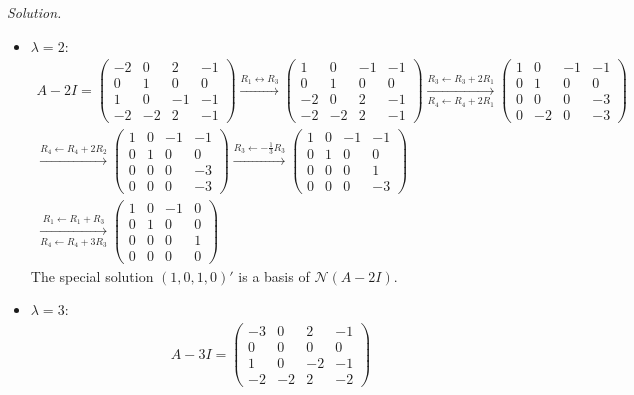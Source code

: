 \documentclass[12pt]{article}
\theoremstyle{definition}
\newenvironment{solution}{\par\noindent\textit{Solution.}\ }{\par\smallskip}
\begin{document}
\begin{solution}
\begin{itemize}
\[\begin{gathered}
\end{gathered}
\]
The special solution \((1,0,1,1)'\) is a basis of \(\mathcal N(A-I)\).
\item \(\lambda=2\):
\[
\begin{gathered}
A-2I=\begin{pmatrix}-2&0&2&-1\\0&1&0&0\\1&0&-1&-1\\-2&-2&2&-1\end{pmatrix}
\xrightarrow{R_1\leftrightarrow R_3}
\begin{pmatrix}1&0&-1&-1\\0&1&0&0\\-2&0&2&-1\\-2&-2&2&-1\end{pmatrix}
\xrightarrow[R_4\leftarrow R_4+2R_1]{R_3\leftarrow R_3+2R_1}
\begin{pmatrix}1&0&-1&-1\\0&1&0&0\\0&0&0&-3\\0&-2&0&-3\end{pmatrix}
\\
\xrightarrow{R_4\leftarrow R_4+2R_2}
\begin{pmatrix}1&0&-1&-1\\0&1&0&0\\0&0&0&-3\\0&0&0&-3\end{pmatrix}
\xrightarrow{R_3\leftarrow-\frac13R_3}
\begin{pmatrix}1&0&-1&-1\\0&1&0&0\\0&0&0&1\\0&0&0&-3\end{pmatrix}
\\
\xrightarrow[R_4\leftarrow R_4+3R_3]{R_1\leftarrow R_1+R_3}
\begin{pmatrix}1&0&-1&0\\0&1&0&0\\0&0&0&1\\0&0&0&0\end{pmatrix}
\end{gathered}
\]
The special solution \((1,0,1,0)'\) is a basis of \(\mathcal N(A-2I)\).
\item \(\lambda=3\):
\[
\begin{gathered}
A-3I=\begin{pmatrix}-3&0&2&-1\\0&0&0&0\\1&0&-2&-1\\-2&-2&2&-2\end{pmatrix}

\end{gathered}\]
\end{itemize}
\end{solution}
\end{document}
